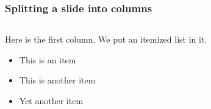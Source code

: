 \documentclass{beamer}
\subtitle{Das Corporate Design in  LaTeX}
\author{Martin Bäker\and Enrico Jörns}
\begin{document}

\begin{frame}[plain]
  \titlepage
\end{frame}


\begin{frame}
\frametitle{Splitting a slide into columns}
\begin{columns}
  \begin{column}{0.5\textwidth}
    Here is the first column.  We put an itemized list in it.
    \begin{itemize}
      \item This is an item
      \item This is another item
      \item Yet another item
    \end{itemize}
  \end{column}
\end{columns}
\end{frame}
\end{document}
